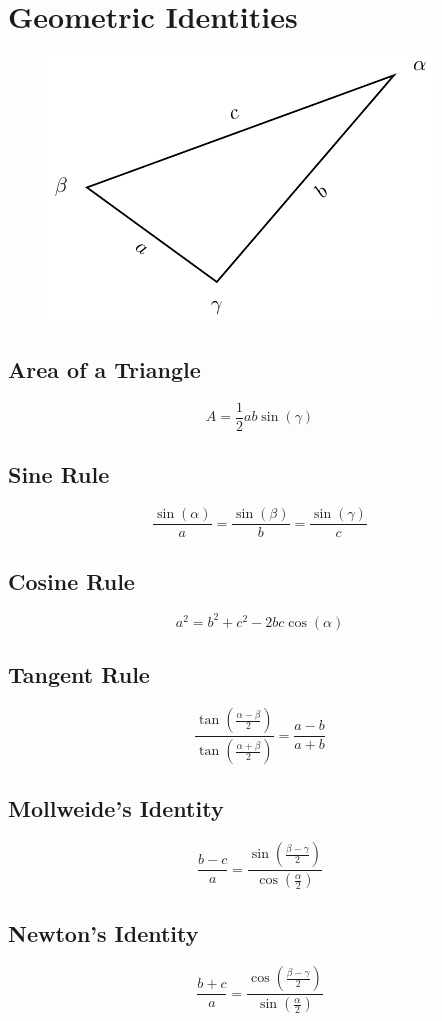 \documentclass{article}
\begin{document}
\section{Geometric Identities}
\begin{figure}[H]
    \centering
    \includegraphics*{figures/triangle.pdf}
\end{figure}
\subsection{Area of a Triangle}
\begin{equation*}
    A=\frac{1}{2}a b \sin{\left( \gamma \right)}
\end{equation*}
\subsection{Sine Rule}
\begin{equation*}
    \frac{\sin{\left( \alpha \right)}}{a} = \frac{\sin{\left( \beta \right)}}{b} = \frac{\sin{\left( \gamma \right)}}{c}
\end{equation*}
\subsection{Cosine Rule}
\begin{equation*}
    a^2=b^2+c^2-2b c\cos{\left( \alpha \right)}
\end{equation*}
\subsection{Tangent Rule}
\begin{equation*}
    \frac{\tan{\left( \frac{\alpha-\beta}{2} \right)}}{\tan{\left( \frac{\alpha+\beta}{2} \right)}} = \frac{a-b}{a+b}
\end{equation*}
\subsection{Mollweide's Identity}
\begin{equation*}
    \frac{b-c}{a}=\frac{\sin{\left( \frac{\beta-\gamma}{2} \right)}}{\cos{\left( \frac{\alpha}{2} \right)}}
\end{equation*}
\subsection{Newton's Identity}
\begin{equation*}
    \frac{b+c}{a}=\frac{\cos{\left( \frac{\beta-\gamma}{2} \right)}}{\sin{\left( \frac{\alpha}{2} \right)}}
\end{equation*}
\end{document}
